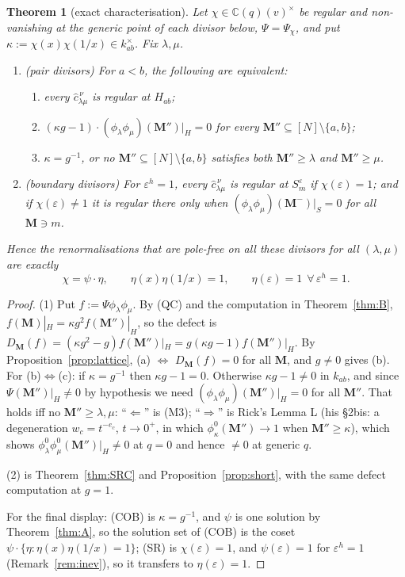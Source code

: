 \documentclass[11pt]{article}
\theoremstyle{plain}
\newtheorem{thm}{Theorem}
\theoremstyle{definition}
\theoremstyle{remark}
\theoremstyle{plain}
\newcommand{\bM}{\mathbf{M}}
\newcommand{\sm}{\setminus}
\begin{document}
\begin{thm}[exact characterisation]\label{thm:C}
Let $\chi\in\mathbb{C}(q)(v)^\times$ be regular and non-vanishing at the generic
point of each divisor below, $\Psi=\Psi_\chi$, and put
$\kappa:=\chi(x)\chi(1/x)\in k_{ab}^\times$.  Fix $\lambda,\mu$.
\begin{enumerate}
\item \textup{(pair divisors)}  For $a<b$, the following are equivalent:
 \begin{enumerate}
  \item every $\widehat c^{\,\nu}_{\lambda\mu}$ is regular at $H_{ab}$;
  \item $(\kappa g-1)\cdot(\phi_\lambda\phi_\mu)(\bM'')|_{H}=0$ for every
        $\bM''\subseteq[N]\sm\{a,b\}$;
  \item $\kappa=g^{-1}$, \emph{or} no $\bM''\subseteq[N]\sm\{a,b\}$ satisfies both
        $\bM''\ge\lambda$ and $\bM''\ge\mu$.
 \end{enumerate}
\item \textup{(boundary divisors)}  For $\varepsilon^h=1$, every
  $\widehat c^{\,\nu}_{\lambda\mu}$ is regular at $S_m^{\varepsilon}$ if
  $\chi(\varepsilon)=1$; and if $\chi(\varepsilon)\ne1$ it is regular there only
  when $(\phi_\lambda\phi_\mu)(\bM^-)|_{S}=0$ for all $\bM\ni m$.
\end{enumerate}
Hence the renormalisations that are pole-free on \emph{all} these divisors for
\emph{all} $(\lambda,\mu)$ are exactly
\[
  \boxed{\ \chi=\psi\cdot\eta,\qquad
   \eta(x)\eta(1/x)=1,\qquad \eta(\varepsilon)=1\ \ \forall\,\varepsilon^{h}=1.\ }
\]
\end{thm}

\begin{proof}
(1) Put $f:=\Psi\phi_\lambda\phi_\mu$.  By (QC) and the computation in
Theorem~\ref{thm:B}, $f(\bM)|_{H}=\kappa g^2 f(\bM'')|_{H}$, so the defect is
$D_{\bM}(f)=(\kappa g^2-g)f(\bM'')|_{H}=g(\kappa g-1)f(\bM'')|_{H}$.  By
Proposition~\ref{prop:lattice}, (a) $\iff$ $D_{\bM}(f)=0$ for all $\bM$, and
$g\ne0$ gives (b).  For (b)$\iff$(c): if $\kappa=g^{-1}$ then $\kappa g-1=0$.
Otherwise $\kappa g-1\ne0$ in $k_{ab}$, and since $\Psi(\bM'')|_H\ne0$ by
hypothesis we need $(\phi_\lambda\phi_\mu)(\bM'')|_{H}=0$ for all $\bM''$.  That
holds iff no $\bM''\ge\lambda,\mu$: ``$\Leftarrow$'' is (M3); ``$\Rightarrow$'' is
Rick's Lemma L (his \S2bis: a degeneration $w_c=t^{-e_c}$, $t\to0^+$, in which
$\phi^0_\kappa(\bM'')\to1$ when $\bM''\ge\kappa$), which shows
$\phi^0_\lambda\phi^0_\mu(\bM'')|_{H}\ne0$ at $q=0$ and hence
$\ne0$ at generic $q$.

(2) is Theorem~\ref{thm:SRC} and Proposition~\ref{prop:short}, with the same defect computation at $g=1$.

For the final display: (COB) is $\kappa=g^{-1}$, and $\psi$ is one solution by
Theorem~\ref{thm:A}, so the solution set of (COB) is the coset
$\psi\cdot\{\eta:\eta(x)\eta(1/x)=1\}$; (SR) is $\chi(\varepsilon)=1$, and
$\psi(\varepsilon)=1$ for $\varepsilon^h=1$ (Remark~\ref{rem:inev}), so it
transfers to $\eta(\varepsilon)=1$.
\end{proof}
\end{document}

